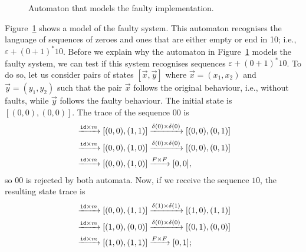 \begin{figure}[t]
    \centering
{}
\caption{Automaton that models the faulty implementation.}
\label{fig:Transformed}
\end{figure}
Figure~\ref{fig:Transformed} shows a model of the faulty system. This automaton recognises the language of sequences of zeroes and ones that are either empty or end in 10; i.e., $\varepsilon+(0+1)^*10$. 
Before we explain why the automaton in Figure~\ref{fig:Transformed} models the faulty system, we can test if this system recognises sequences $\varepsilon+(0+1)^*10$. %
To do so, let us consider pairs of states $[\vec{x},\vec{y}]$ where $\vec{x}=(x_1,x_2)$ and $\vec{y}=(y_1,y_2)$ such that the pair $\vec{x}$ follows the original behaviour, i.e., without faults, while $\vec{y}$ follows the faulty behaviour. 
The initial state is $[(0,0),(0,0)]$. %
The trace of the sequence $00$ is 
\begin{align*}
   [(0,0),(0,0)]&\xrightarrow{\id\times m}[(0,0),(1,1)]\xrightarrow{\delta(0)\times\delta(0)}[(0,0),(0,1)]\\
   &\xrightarrow{\id\times m}[(0,0),(1,0)]\xrightarrow{\delta(0)\times\delta(0)}[(0,0),(0,1)]\\
   &\xrightarrow{\id\times m}[(0,0),(1,0)]\xrightarrow{F\times F}[0,0],
\end{align*}
so $00$ is rejected by both automata. %
Now, if we receive the sequence $10$, the resulting state trace is 
\begin{align*}
    [(0,0),(0,0)]&\xrightarrow{\id\times m}[(0,0),(1,1)]\xrightarrow{\delta(1)\times\delta(1)}[(1,0),(1,1)]\\
   &\xrightarrow{\id\times m}[(1,0),(0,0)]\xrightarrow{\delta(0)\times\delta(0)}[(0,1),(0,0)]\\
   &\xrightarrow{\id\times m}[(1,0),(1,1)]\xrightarrow{F\times F}[0,1];
\end{align*}

